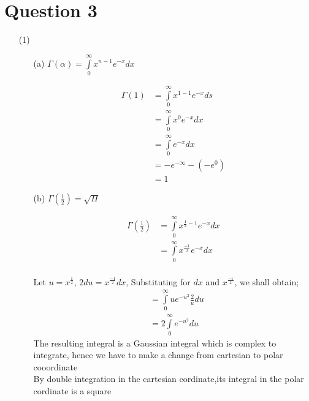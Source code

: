 \documentclass[12pt,a4paper]{article}
\begin{document}
\section*{Question 3}
\begin{itemize}
\item[(1)]
\begin{itemize}
\item[(a)] $ \Gamma \left( \alpha \right) = \int\limits_0^\infty {x^{n - 1} e^{ - x} dx}$

\begin{align*}
 \Gamma \left( 1 \right) &= \int\limits_0^\infty {x^{1 - 1} e^{ - x} ds}\\
 &=\int\limits_0^\infty {x^{0} e^{ - x} dx}\\
 &=\int\limits_0^\infty {e^{ - x} dx}\\
 &=-e^{-\infty}-\left(-e^{0}\right)\\
 &=1
\end{align*}

\item[(b)]$ \Gamma \left( \frac{1}{2}\right) = \sqrt{ \Pi}$

\begin{align*}
\Gamma \left( \frac{1}{2}\right) &= \int\limits_0^\infty {x^{\frac{1}{2} - 1} e^{ - x} dx}\\
&=\int\limits_0^\infty {x^{\frac{-1}{2}} e^{ - x} dx}\\
\end{align*}

Let $u=x^{\frac{1}{2}}$, $2du=x^{\frac{-1}{2}}dx$, Substituting for $dx$ and $x^{\frac{-1}{2}}$, we shall obtain;\\

\begin{align*}
&=\int\limits_0^\infty {u} e^{ - u^{2}} \frac{2}{u} du\\
&=2\int\limits_0^\infty {} e^{ - u^{2}}du
\end{align*}
The resulting integral is a Gaussian integral which is complex to integrate, hence we have to make a change from cartesian to polar cooordinate\\

By double integration in the cartesian cordinate,its integral in the polar cordinate is a square\\


\end{itemize}
\end{itemize}
\end{document}
